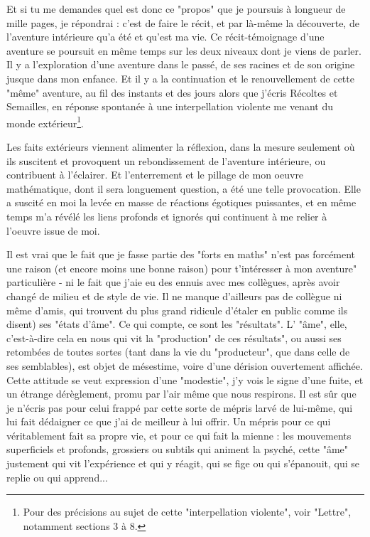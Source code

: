 Et si tu me demandes quel est donc ce "propos" que je poursuis à longueur de mille pages, je répondrai : c'est de faire le récit, et par là-même la découverte, de l'aventure intérieure qu'a été et qu'est ma vie. Ce récit-témoignage d'une aventure se poursuit en même temps sur les deux niveaux dont je viens de parler. Il y a l'exploration d'une aventure dans le passé, de ses racines et de son origine jusque dans mon enfance. Et il y a la continuation et le renouvellement de cette "même" aventure, au fil des instants et des jours alors que j'écris Récoltes et Semailles, en réponse spontanée à une interpellation violente me venant du monde extérieur\footnote{Pour des précisions au sujet de cette "interpellation violente", voir "Lettre", notamment sections 3 à 8.}.

Les faits extérieurs viennent alimenter la réflexion, dans la mesure seulement où ils suscitent et provoquent un rebondissement de l'aventure intérieure, ou contribuent à l'éclairer. Et l'enterrement et le pillage de mon oeuvre mathématique, dont il sera longuement question, a été une telle provocation. Elle a suscité en moi la levée en masse de réactions égotiques puissantes, et en même temps m'a révélé les liens profonds et ignorés qui continuent à me relier à l'oeuvre issue de moi.

Il est vrai que le fait que je fasse partie des "forts en maths" n'est pas forcément une raison (et encore moins une bonne raison) pour t'intéresser à mon aventure" particulière - ni le fait que j'aie eu des ennuis avec mes collègues, après avoir changé de milieu et de style de vie. Il ne manque d'ailleurs pas de collègue ni même d'amis, qui trouvent du plus grand ridicule d'étaler en public comme ils disent) ses "états d'âme". Ce qui compte, ce sont les "résultats". L' "âme", elle, c'est-à-dire cela en nous qui vit la "production" de ces résultats", ou aussi ses retombées de toutes sortes (tant dans la vie du "producteur", que dans celle de ses semblables), est objet de mésestime, voire d'une dérision ouvertement affichée. Cette attitude se veut expression d'une "modestie", j'y vois le signe d'une fuite, et un étrange dérèglement, promu par l'air même que nous respirons. Il est sûr que je n'écris pas pour celui frappé par cette sorte de mépris larvé de lui-même, qui lui fait dédaigner ce que j'ai de meilleur à lui offrir. Un mépris pour ce qui véritablement fait sa propre vie, et pour ce qui fait la mienne : les mouvements superficiels et profonds, grossiers ou subtils qui animent la psyché, cette "âme" justement qui vit l'expérience et qui y réagit, qui se fige ou qui s'épanouit, qui se replie ou qui apprend...

